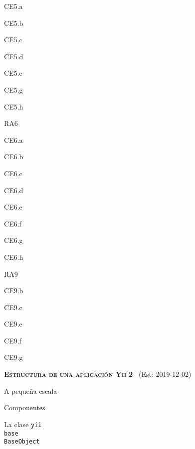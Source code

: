 \begin{longenum}
\begin{longenum}
\begin{longenum}
\begin{longenum}
\begin{longenum}
                    \item CE5.a
                    \item CE5.b
                    \item CE5.c
                    \item CE5.d
                    \item CE5.e
                    \item CE5.g
                    \item CE5.h
                \end{longenum}
                \item RA6
                \begin{longenum}
                    \item CE6.a
                    \item CE6.b
                    \item CE6.c
                    \item CE6.d
                    \item CE6.e
                    \item CE6.f
                    \item CE6.g
                    \item CE6.h
                \end{longenum}
                \item RA9
                \begin{longenum}
                    \item CE9.b
                    \item CE9.c
                    \item CE9.e
                    \item CE9.f
                    \item CE9.g
                \end{longenum}
            \end{longenum}
        \end{longenum}
    \end{longenum}
    \item \textbf{\textsc{Estructura de una aplicación Yii 2}} \ (Est: 2019-12-02)
    \begin{longenum}
        \item A pequeña escala
        \begin{longenum}
            \item Componentes
            \begin{longenum}
                \item La clase \texttt{yii\\base\\BaseObject}

\end{longenum}
\end{longenum}
\end{longenum}
\end{longenum}
